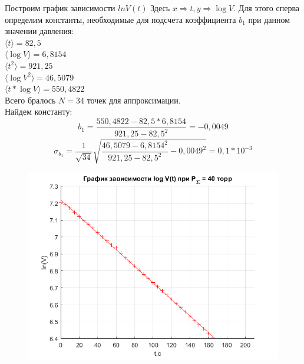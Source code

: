 \documentclass[a4paper,12pt]{article}
\begin{document}
\begin{enumerate}
Построим график зависимости $lnV(t)$ Здесь $x \Rightarrow t, y \Rightarrow \log V$. Для этого сперва определим константы, необходимые для подсчета коэффициента $b_1$ при данном значении давления:\\
$\langle t \rangle = 82,5$\\ 
$\langle \log V \rangle = 6,8154$\\
$\langle t^2 \rangle = 921,25$\\
$\langle \log V^2 \rangle = 46,5079$\\
$\langle t*\log V \rangle = 550,4822$\\
Всего бралось $ N = 34$ точек для аппроксимации. \\
Найдем константу:
\begin{equation*}
b_1 = \dfrac{550,4822 - 82,5*6,8154}{921,25 - 82,5^2} =  -0,0049 
\end{equation*}
\begin{equation*}
\sigma_{b_1} = \frac{1}{\sqrt{34}}\sqrt{\frac{46,5079 - 6,8154^2}{921,25 - 82,5^2} - 0,0049^2} = 0,1 * 10^{-3}
\end{equation*}
\begin{figure}[h]
\begin{center}
\begin{minipage}[h]{0.45\linewidth}
\includegraphics[width=1\linewidth]{gr_40_t.png}
\end{minipage}
\hfill
\begin{minipage}[h]{0.45\linewidth}

\end{minipage}
\end{center}
\end{figure}
\end{enumerate}
\end{document}
